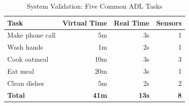 \begin{table}[t]
\centering
\caption{System Validation: Five Common ADL Tasks}
\label{tab:validation_compact}
\small
\begin{tabular}{@{}lrrr@{}}
\toprule
\textbf{Task} & \textbf{Virtual Time} & \textbf{Real Time} & \textbf{Sensors} \\
\midrule
Make phone call & 5m & 3s & 1 \\
Wash hands & 1m & 2s & 1 \\
Cook oatmeal & 10m & 3s & 3 \\
Eat meal & 20m & 3s & 1 \\
Clean dishes & 5m & 2s & 2 \\
\midrule
\textbf{Total} & \textbf{41m} & \textbf{13s} & \textbf{8} \\
\bottomrule
\end{tabular}
\end{table}


%




